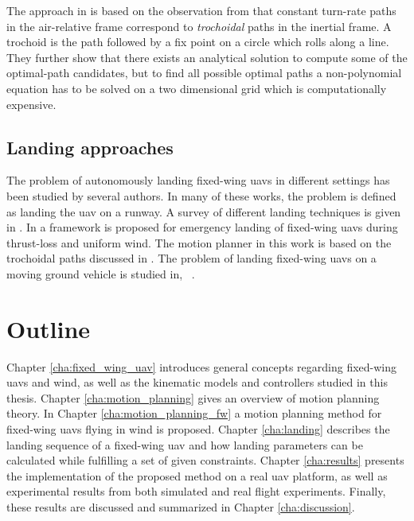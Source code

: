 The approach in \cite{optimal_path_trochoidal} is based on the observation from \cite{course_hdg_wind} that 
constant turn-rate paths in the air-relative frame correspond to \textit{trochoidal} paths in the inertial frame. A trochoid is the path followed by a fix point on a circle which rolls along a line.
They further show that there exists an analytical solution to compute some of the optimal-path candidates, but to find 
all possible optimal paths a non-polynomial equation has to be solved on a two dimensional grid which is computationally expensive.

\subsection{Landing approaches}
The problem of autonomously landing fixed-wing \acp{uav} in different settings has been studied by several authors. 
In many of these works, the problem is defined as landing the \ac{uav} on a runway. A survey of different landing techniques is given in \cite{survey_landing}.
In \cite{emergency_landing} a framework is proposed for emergency landing of fixed-wing \acp{uav} during thrust-loss and uniform wind. The motion planner in this work is based on the 
trochoidal paths discussed in \cite{optimal_path_trochoidal}. The problem of landing fixed-wing \acp{uav} on a moving ground vehicle is studied in, \eg\, \cite{landing_on_vehicle}.

\section{Outline}
Chapter \ref{cha:fixed_wing_uav} introduces general concepts regarding fixed-wing \acp{uav} and wind, as well as the kinematic models and controllers studied in this thesis.
Chapter \ref{cha:motion_planning} gives an overview of motion planning theory. In Chapter \ref{cha:motion_planning_fw}
a motion planning method for fixed-wing \acp{uav} flying in wind is proposed.
Chapter \ref{cha:landing} describes the landing sequence of a fixed-wing \ac{uav} and how landing parameters can be calculated while fulfilling a set of given constraints. 
Chapter \ref{cha:results} presents the implementation of the proposed method on a real \ac{uav} platform, as well as experimental 
results from both simulated and real flight experiments. Finally, these results are discussed and summarized in Chapter \ref{cha:discussion}.